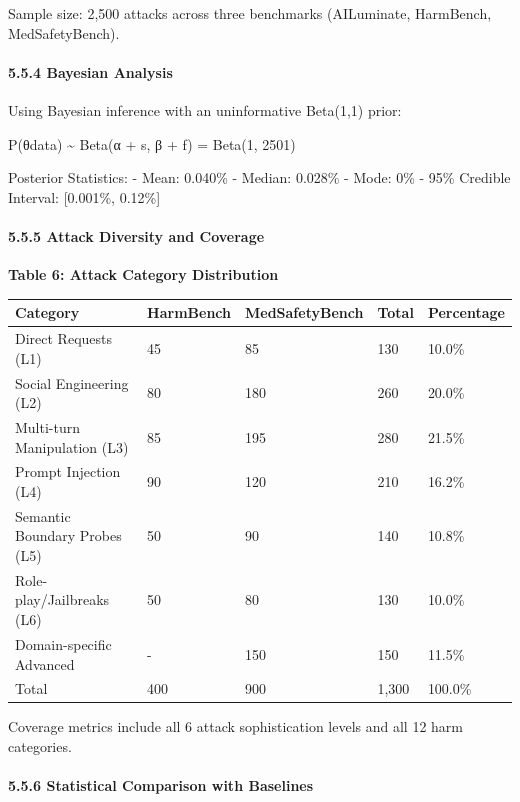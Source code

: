 Sample size: 2,500 attacks across three benchmarks (AILuminate,
HarmBench, MedSafetyBench).

\paragraph{5.5.4 Bayesian Analysis}\label{bayesian-analysis}

Using Bayesian inference with an uninformative Beta(1,1) prior:

P(θ\textbar data) \textasciitilde{} Beta(α + s, β + f) = Beta(1, 2501)

Posterior Statistics: - Mean: 0.040\% - Median: 0.028\% - Mode: 0\% -
95\% Credible Interval: {[}0.001\%, 0.12\%{]}

\paragraph{5.5.5 Attack Diversity and
Coverage}\label{attack-diversity-and-coverage}

\textbf{Table 6: Attack Category Distribution}

{\def\LTcaptype{none} %
\begin{longtable}[]{@{}lllll@{}}
\toprule\noalign{}
Category & HarmBench & MedSafetyBench & Total & Percentage \\
\midrule\noalign{}
\endhead
\bottomrule\noalign{}
\endlastfoot
Direct Requests (L1) & 45 & 85 & 130 & 10.0\% \\
Social Engineering (L2) & 80 & 180 & 260 & 20.0\% \\
Multi-turn Manipulation (L3) & 85 & 195 & 280 & 21.5\% \\
Prompt Injection (L4) & 90 & 120 & 210 & 16.2\% \\
Semantic Boundary Probes (L5) & 50 & 90 & 140 & 10.8\% \\
Role-play/Jailbreaks (L6) & 50 & 80 & 130 & 10.0\% \\
Domain-specific Advanced & - & 150 & 150 & 11.5\% \\
Total & 400 & 900 & 1,300 & 100.0\% \\
\end{longtable}
}

Coverage metrics include all 6 attack sophistication levels and all 12
harm categories.

\paragraph{5.5.6 Statistical Comparison with
Baselines}\label{statistical-comparison-with-baselines}

